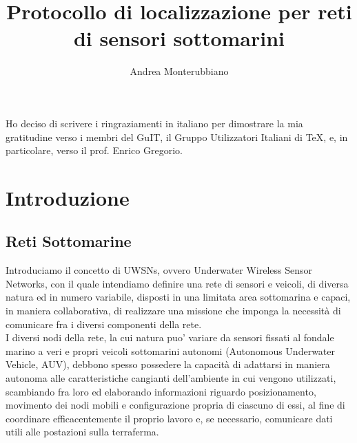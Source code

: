 \documentclass[Lau,binding=0.6cm]{sapthesis}
\title{Protocollo di localizzazione per reti di sensori sottomarini}
\author{Andrea Monterubbiano}
\begin{document}
\frontmatter

\maketitle

\dedication{Dedicato a\\ Donald Knuth}

\begin{abstract}

\end{abstract}

\begin{acknowledgments}
Ho deciso di scrivere i ringraziamenti in italiano
per dimostrare la mia gratitudine verso i membri
del GuIT, il Gruppo Utilizzatori Italiani di \TeX, e, in particolare,
verso il prof. Enrico Gregorio.
\end{acknowledgments}

\tableofcontents

\mainmatter

\chapter{Introduzione}

\section{Reti Sottomarine}
Introduciamo il concetto di UWSNs, ovvero Underwater Wireless  Sensor Networks, con il quale intendiamo definire una rete di sensori e veicoli, di diversa natura ed in numero variabile, disposti in una limitata area sottomarina e capaci, in maniera collaborativa, di realizzare una missione che imponga la necessità di comunicare fra i diversi componenti della rete.\\
I diversi nodi della rete, la cui natura puo' variare da sensori fissati al fondale marino a veri e propri veicoli sottomarini autonomi (Autonomous Underwater Vehicle, AUV), debbono spesso possedere la capacità di adattarsi in maniera autonoma alle caratteristiche cangianti dell'ambiente in cui vengono utilizzati, scambiando fra loro ed elaborando informazioni riguardo posizionamento, movimento dei nodi mobili e configurazione propria di ciascuno di essi, al fine di coordinare efficacentemente il proprio lavoro e, se necessario, comunicare dati utili alle postazioni sulla terraferma.
\end{document}
